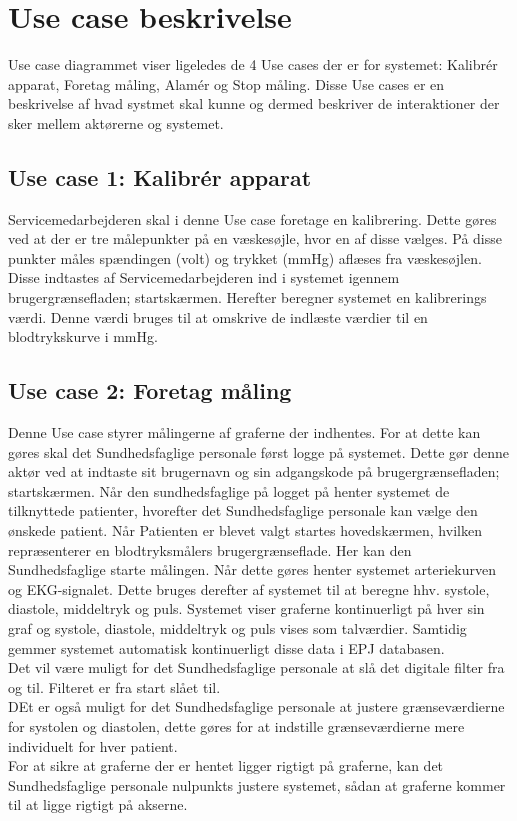 \section{Use case beskrivelse}
Use case diagrammet viser ligeledes de 4 Use cases der er for systemet: Kalibrér apparat, Foretag måling, Alamér og Stop måling. Disse Use cases er en beskrivelse af hvad systmet skal kunne og dermed beskriver de interaktioner der sker mellem aktørerne og systemet.
\\
\subsection{Use case 1: Kalibrér apparat}
Servicemedarbejderen skal i denne Use case foretage en kalibrering. Dette gøres ved at der er tre målepunkter på en væskesøjle, hvor en af disse vælges. På disse punkter måles spændingen (volt) og trykket (mmHg) aflæses fra væskesøjlen. Disse indtastes af Servicemedarbejderen ind i systemet igennem brugergrænsefladen; startskærmen. Herefter beregner systemet en kalibrerings værdi. Denne værdi bruges til at omskrive de indlæste værdier til en blodtrykskurve i mmHg.
\subsection{Use case 2: Foretag måling}
Denne Use case styrer målingerne af graferne der indhentes. For at dette kan gøres skal det Sundhedsfaglige personale først logge på systemet. Dette gør denne aktør ved at indtaste sit brugernavn og sin adgangskode på brugergrænsefladen; startskærmen. Når den sundhedsfaglige på logget på henter systemet de tilknyttede patienter, hvorefter det Sundhedsfaglige personale kan vælge den ønskede patient. Når Patienten er blevet valgt startes hovedskærmen, hvilken repræsenterer en blodtryksmålers brugergrænseflade. Her kan den Sundhedsfaglige starte målingen. Når dette gøres henter systemet arteriekurven og EKG-signalet. Dette bruges derefter af systemet til at beregne hhv. systole, diastole, middeltryk og puls. Systemet viser graferne kontinuerligt på hver sin graf og systole, diastole, middeltryk og puls vises som talværdier. Samtidig gemmer systemet automatisk kontinuerligt disse data i EPJ databasen. \\
Det vil være muligt for det Sundhedsfaglige personale at slå det digitale filter fra og til. Filteret er fra start slået til.\\
DEt er også muligt for det Sundhedsfaglige personale at justere grænseværdierne for systolen og diastolen, dette gøres for at indstille grænseværdierne mere individuelt for hver patient.\\
For at sikre at graferne der er hentet ligger rigtigt på graferne, kan det Sundhedsfaglige personale nulpunkts justere systemet, sådan at graferne kommer til at ligge rigtigt på akserne.
